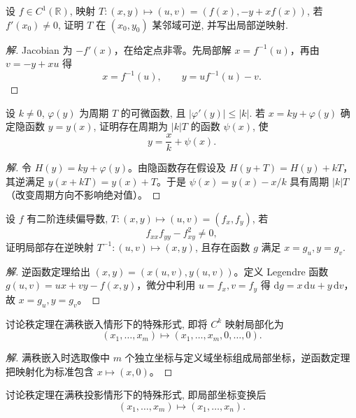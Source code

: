 \documentclass[../../数学分析培优讲义(答案版).tex]{subfiles}
\begin{document}
\begin{example}
设 $f\in C^1(\mathbb{R})$, 映射 $T:(x,y)\mapsto(u,v)=(f(x),-y+xf(x))$, 若 $f'(x_0)\ne0$, 证明 $T$ 在 $(x_0,y_0)$ 某邻域可逆, 并写出局部逆映射.
\end{example}

\begin{proof}[解]
Jacobian 为 $-f'(x)$，在给定点非零。先局部解 $x=f^{-1}(u)$，再由 $v=-y+xu$ 得
\[
x=f^{-1}(u),\qquad y=u f^{-1}(u)-v.
\]
\end{proof}

\begin{example}
设 $k\ne0$, $\varphi(y)$ 为周期 $T$ 的可微函数, 且 $|\varphi'(y)|\leq|k|$. 若 $x=ky+\varphi(y)$ 确定隐函数 $y=y(x)$, 证明存在周期为 $|k|T$ 的函数 $\psi(x)$, 使
\[
    y=\dfrac{x}{k}+\psi(x).
\]
\end{example}

\begin{proof}[解]
令 $H(y)=ky+\varphi(y)$。由隐函数存在假设及 $H(y+T)=H(y)+kT$，其逆满足 $y(x+kT)=y(x)+T$。于是 $\psi(x)=y(x)-x/k$ 具有周期 $|k|T$（改变周期方向不影响绝对值）。
\end{proof}

\begin{example}
设 $f$ 有二阶连续偏导数, $T:(x,y)\mapsto(u,v)=(f_x,f_y)$, 若
\[
    f_{xx}f_{yy}-f_{xy}^2\ne0,
\]
证明局部存在逆映射 $T^{-1}:(u,v)\mapsto(x,y)$, 且存在函数 $g$ 满足 $x=g_u,y=g_v$.
\end{example}

\begin{proof}[解]
逆函数定理给出 $(x,y)=(x(u,v),y(u,v))$。定义 Legendre 函数
$g(u,v)=ux+vy-f(x,y)$，微分中利用 $u=f_x,v=f_y$ 得 $\mathrm dg=x\,\mathrm du+y\,\mathrm dv$，故 $x=g_u,y=g_v$。
\end{proof}


\begin{example}
讨论秩定理在满秩嵌入情形下的特殊形式, 即将 $C^k$ 映射局部化为
\[
    (x_1,\ldots,x_m)\mapsto(x_1,\ldots,x_m,0,\ldots,0).
\]
\end{example}

\begin{proof}[解]
满秩嵌入时选取像中 $m$ 个独立坐标与定义域坐标组成局部坐标，逆函数定理把映射化为标准包含 $x\mapsto(x,0)$。
\end{proof}

\begin{example}
讨论秩定理在满秩投影情形下的特殊形式, 即局部坐标变换后
\[
    (x_1,\ldots,x_m)\mapsto(x_1,\ldots,x_n).
\]
\end{example}
\end{document}
